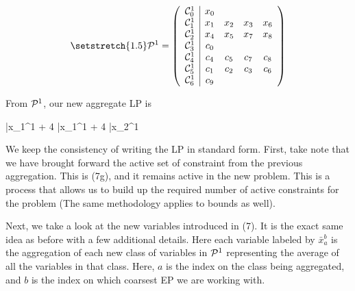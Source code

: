\documentclass[11pt]{article} %
\newcommand{\cP}{{\cal P}}
\newcommand{\cC}{{\cal C}}
\begin{document}
	\begin{equation}\setstretch{1.5}
	\mathcal{P}^1 = 
	\begin{pmatrix}
	\begin{array}{c|cccc}
	\cC_0^1 & x_0 &&& \\
	\cC_1^1 & x_1 & x_2 & x_3 & x_6 \\
	\cC_2^1& x_4 & x_5 & x_7 & x_8 \\
	\cC_3^1 & c_0 &&& \\
	\cC_4^1 & c_4 & c_5 & c_7 & c_8 \\
	\cC_5^1 & c_1 & c_2 & c_3 & c_6 \\
	\cC_6^1 & c_9 &&&
 	\end{array}
	\end{pmatrix}
	\end{equation}
	
	From $\cP^1$, our new aggregate LP is 
	
	\begin{mini!}
		{}{\bar{x}_1^1 + 4 \bar{x}_1^1 + 4 \bar{x}_2^1}{}{}
	\end{mini!}

	We keep the consistency of writing the LP in standard form.  First, take note that we have brought forward the active set of constraint from the previous aggregation.  This is (7g), and it remains active in the new problem.  This is a process that allows us to build up the required number of active constraints for the problem (The same methodology applies to bounds as well).
	
	Next, we take a look at the new variables introduced in (7).  It is the exact same idea as before with a few additional details.  Here each variable labeled by $\bar{x}_a^b$ is the aggregation of each new class of variables in $\cP^1$ representing the average of all the variables in that class.  Here, $a$ is the index on the class being aggregated, and $b$ is the index on which coarsest EP we are working with.  
	
\end{document}
